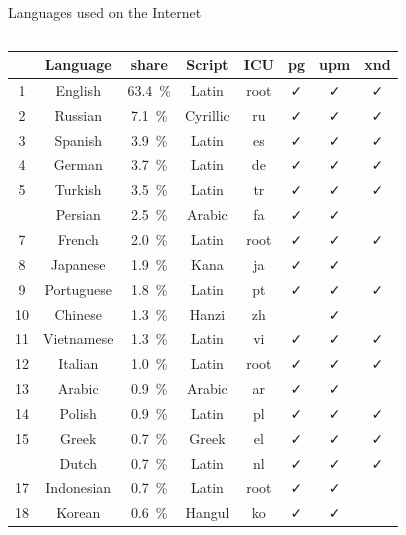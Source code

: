 \documentclass[aspectratio=169,10pt]{beamer}
\newcommand{\colRd}{\color{purple}}
\newcommand{\colGn}{\color{teal}}
\begin{document}

\begin{frame}{Languages used on the Internet}

\setlength\dashlinedash{0.5pt}
\setlength\dashlinegap{1.0pt}

\begin{columns}
\begin{column}{69mm}
\begin{center}
\scriptsize
\begin{tabular}{cc@{~}c@{~}c|c@{~~}c@{~~}c@{~~}c}
  & Language & share & Script & ICU & pg & upm & xnd\\\hline\hline
1 & English & 63.4~\%     &   Latin &  root    & ✓ & ✓ & ✓  \\
2 & Russian & 7.1~\%      &   Cyrillic & ru    & ✓ & ✓ & ✓  \\
3 & Spanish & 3.9~\%      &   Latin &    es    & ✓ & ✓ & ✓  \\
4 & German & 3.7~\%       &   Latin &    de    & ✓ & ✓ & ✓  \\
5 & Turkish & 3.5~\%      &   Latin &    tr    & ✓ & ✓ & ✓  \\\hdashline
6 & Persian & 2.5~\%      &   {\colGn Arabic } &   fa    & ✓ & ✓ &     \\
7 & French & 2.0~\%       &   Latin &    root  & ✓ & ✓ & ✓  \\
8 & Japanese & 1.9~\%     &   {\colRd Kana   } &   ja    & ✓ & ✓ &     \\
9 & Portuguese & 1.8~\%   &   Latin &    pt    & ✓ & ✓ & ✓  \\
10 & Chinese & 1.3~\%     &   {\colRd Hanzi  } &   zh    &    & ✓ &     \\\hline
11 & Vietnamese & 1.3~\%  &   Latin &    vi    & ✓ & ✓ & ✓  \\
12 & Italian & 1.0~\%     &   Latin &    root  & ✓ & ✓ & ✓  \\
13 & Arabic & 0.9~\%      &   {\colGn Arabic } &   ar    & ✓ & ✓ &     \\
14 & Polish & 0.9~\%      &   Latin &    pl    & ✓ & ✓ & ✓  \\
15 & Greek & 0.7~\%       &   Greek &    el    & ✓ & ✓ & ✓  \\\hdashline
16 & Dutch & 0.7~\%       &   Latin &    nl    & ✓ & ✓ & ✓  \\
17 & Indonesian & 0.7~\%  &   Latin &    root  & ✓ & ✓ &     \\%
18 & Korean & 0.6~\%      &   {\colRd Hangul } &   ko    & ✓ & ✓ &     \\

\end{tabular}
\end{center}
\end{column}
\end{columns}
\end{frame}
\end{document}
